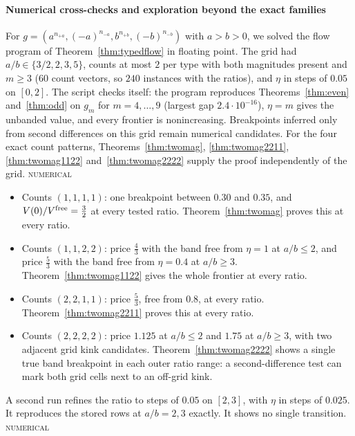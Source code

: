 \documentclass[conference]{IEEEtran}
\theoremstyle{definition}
\newcommand{\NUM}{\textsc{numerical}}
\begin{document}
\paragraph{Numerical cross-checks and exploration beyond the exact families}
For $g=(a^{n_{+a}},(-a)^{n_{-a}},b^{n_{+b}},(-b)^{n_{-b}})$ with $a>b>0$, we solved the flow
program of Theorem~\ref{thm:typedflow} in floating point. The grid had $a/b\in\{3/2,2,3,5\}$,
counts at most $2$ per type with both magnitudes present and $m\ge3$ ($60$ count vectors, so
$240$ instances with the ratios), and $\eta$ in steps of $0.05$ on
$[0,2]$. The script checks itself: the program reproduces Theorems~\ref{thm:even}
and~\ref{thm:odd} on $g_m$ for $m=4,\dots,9$ (largest gap $2.4\cdot10^{-16}$), $\eta=m$ gives the
unbanded value, and every frontier is nonincreasing. Breakpoints inferred only from second
differences on this grid remain numerical candidates. For the four exact count patterns,
Theorems~\ref{thm:twomag}, \ref{thm:twomag2211}, \ref{thm:twomag1122} and~\ref{thm:twomag2222}
supply the proof independently of the grid. \NUM{}
\begin{itemize}
\item Counts $(1,1,1,1)$: one breakpoint between $0.30$ and $0.35$, and
$V(0)/V^{\rm free}=\frac32$ at every tested ratio. Theorem~\ref{thm:twomag} proves this at
every ratio.
\item Counts $(1,1,2,2)$: price $\frac43$ with the band free from $\eta=1$ at $a/b\le2$, and
price $\frac53$ with the band free from $\eta=0.4$ at $a/b\ge3$. Theorem~\ref{thm:twomag1122} gives
the whole frontier at every ratio.
\item Counts $(2,2,1,1)$: price $\frac53$, free from $0.8$, at every ratio.
Theorem~\ref{thm:twomag2211} proves this at every ratio.
\item Counts $(2,2,2,2)$: price $1.125$ at $a/b\le2$ and $1.75$ at $a/b\ge3$, with two adjacent grid kink candidates. Theorem~\ref{thm:twomag2222}
shows a single true band breakpoint in each outer ratio range: a second-difference test can
mark both grid cells next to an off-grid kink.
\end{itemize}
A second run refines the ratio to steps of $0.05$ on $[2,3]$, with $\eta$ in steps of
$0.025$. It reproduces the stored rows at $a/b=2,3$ exactly. It shows no single transition.
\NUM{}
\end{document}
